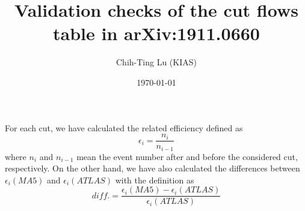 \documentclass[12pt,A4paper,pdftex, ]{article}
\title{Validation checks of the cut flows table in arXiv:1911.0660}
\author{Chih-Ting Lu (KIAS)
\date{\today}
}
\begin{document}
\maketitle

For each cut, we have calculated the related efficiency defined as 
\begin{equation}
\epsilon_i =\frac{n_i}{n_{i-1}}
\end{equation}
where $ n_i $ and $ n_{i-1} $ mean the event number after and before the considered cut, respectively.
%
On the other hand, we have also calculated the differences between $ \epsilon_i (MA5)$ and $ \epsilon_i (ATLAS)$ with the definition as
\begin{equation}
diff. = \frac{\epsilon_i (MA5)-\epsilon_i (ATLAS)}{\epsilon_i (ATLAS)}
\end{equation}
\end{document}
